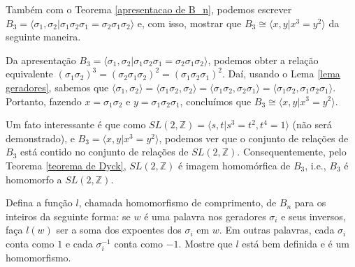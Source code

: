 	\par\vspace{0.3cm} Também com o Teorema \eqref{apresentacao de B_n}, podemos escrever 
	$B_3 = \langle \sigma_1,\sigma_2 | \sigma_1\sigma_2\sigma_1 = \sigma_2\sigma_1\sigma_2 \rangle$ e, 
	com isso, mostrar que $B_3 \cong\langle x,y | x^3=y^2 \rangle$ da seguinte maneira.
	
	\par\vspace{0.3cm} Da apresentação $B_3 = \langle \sigma_1,\sigma_2 | \sigma_1\sigma_2\sigma_1 
	= \sigma_2\sigma_1\sigma_2 \rangle$, podemos obter a relação equivalente 
	$(\sigma_1\sigma_2)^3 = (\sigma_2\sigma_1\sigma_2)^2 = (\sigma_1\sigma_2\sigma_1)^2$. Daí, usando 
	o Lema \eqref{lema geradores}, sabemos que $\langle \sigma_1,\sigma_2 \rangle 
	= \langle \sigma_1\sigma_2,\sigma_2 \rangle = \langle \sigma_1\sigma_2, \sigma_2\sigma_1 \rangle 
	= \langle \sigma_1\sigma_2, \sigma_1\sigma_2\sigma_1 \rangle$. Portanto, fazendo 
	$x = \sigma_1\sigma_2$ e $y = \sigma_1\sigma_2\sigma_1$, concluímos que 
	$B_3 \cong \langle x,y | x^3=y^2 \rangle$.
	\begin{remark}
		Um fato interessante é que como $SL(2,\mathbb{Z}) = \langle s,t | s^3 = t^2, t^4 = 1 \rangle$ 
		(não será demonstrado), e $B_3 = \langle x,y| x^3 = y^2 \rangle$, podemos ver que o conjunto de 
		relações de $B_3$ está contido no conjunto de relações de $SL(2,\mathbb{Z})$. Consequentemente, 
		pelo Teorema \eqref{teorema de Dyck}, $SL(2,\mathbb{Z})$ é imagem homomórfica de $B_3$, i.e., 
		$B_3$ é homomorfo a $SL(2,\mathbb{Z})$. 
	\end{remark}
	\begin{lemma}
	\label{homomorfismo de comprimento}
		Defina a função $l$, chamada homomorfismo de comprimento, de $B_n$ para os inteiros da seguinte forma: 
		se $w$ é uma palavra nos geradores $\sigma_i$ e seus inversos, faça $l(w)$ ser a soma dos expoentes 
		dos $\sigma_i$ em $w$. Em outras palavras, cada $\sigma_i$ conta como $1$ e cada $\sigma_i^{-1}$ conta 
		como $-1$. Mostre que $l$ está bem definida e é um homomorfismo.
	\end{lemma}

